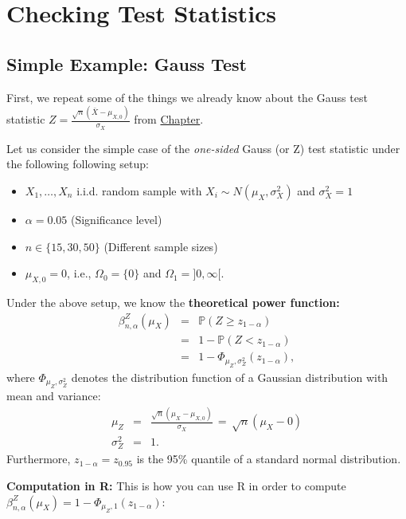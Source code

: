 \documentclass[]{book}
\providecommand{\tightlist}{%
  \setlength{\itemsep}{0pt}\setlength{\parskip}{0pt}}
\theoremstyle{definition}
\theoremstyle{definition}
\theoremstyle{definition}
\theoremstyle{remark}
\begin{document}
\hypertarget{checking-test-statistics}{%
\section{Checking Test Statistics}\label{checking-test-statistics}}

\hypertarget{simple-example-gauss-test}{%
\subsection{Simple Example: Gauss Test}\label{simple-example-gauss-test}}

First, we repeat some of the things we already know about the Gauss test statistic \(Z=\frac{\sqrt{n}(\bar{X}-\mu_{X,0})}{\sigma_X}\) from \protect\hyperlink{PF1}{Chapter}.

Let us consider the simple case of the \emph{one-sided} Gauss (or Z) test statistic under the following following setup:

\begin{itemize}
\tightlist
\item
  \(X_1,\dots,X_n\) i.i.d. random sample with \(X_i\sim N(\mu_X,\sigma_X^2)\) and \(\sigma_X^2=1\)
\item
  \(\alpha=0.05\) (Significance level)
\item
  \(n\in\{15,30,50\}\) (Different sample sizes)
\item
  \(\mu_{X,0}=0\), i.e., \(\Omega_0=\{0\}\) and \(\Omega_1=]0,\infty[\).
\end{itemize}

Under the above setup, we know the \textbf{theoretical power function:}
\[
\begin{array}{rcl}
\beta^{Z}_{n,\alpha}(\mu_X)
&=&\mathbb{P}(Z \geq z_{1-\alpha})\\
&=&1-\mathbb{P}(Z < z_{1-\alpha})\\
&=&1-\Phi_{\mu_Z,\sigma^2_Z}(z_{1-\alpha}),
\end{array}
\]
where \(\Phi_{\mu_Z,\sigma_Z^2}\) denotes the distribution function of a Gaussian distribution with mean and variance:
\[
\begin{array}{rcl}
\mu_Z&=&\frac{\sqrt{n}(\mu_X-\mu_{X,0})}{\sigma_X}
\,=\,\sqrt{n}(\mu_X-0)\\
\sigma^2_Z&=&1.
\end{array}
\]
Furthermore, \(z_{1-\alpha}=z_{0.95}\) is the 95\% quantile of a standard normal distribution.

\textbf{Computation in R:}
This is how you can use R in order to compute \(\beta^{Z}_{n,\alpha}(\mu_X)=1-\Phi_{\mu_Z,1}(z_{1-\alpha})\):
\end{document}
